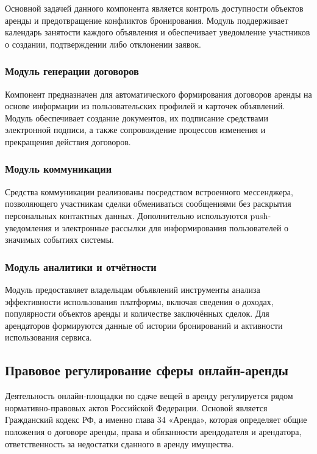Основной задачей данного компонента является контроль доступности объектов аренды и предотвращение конфликтов бронирования. Модуль поддерживает календарь занятости каждого объявления и обеспечивает уведомление участников о создании, подтверждении либо отклонении заявок.

\subsubsection{Модуль генерации договоров}

Компонент предназначен для автоматического формирования договоров аренды на основе информации из пользовательских профилей и карточек объявлений. Модуль обеспечивает создание документов, их подписание средствами электронной подписи, а также сопровождение процессов изменения и прекращения действия договоров.

\subsubsection{Модуль коммуникации}

Средства коммуникации реализованы посредством встроенного мессенджера, позволяющего участникам сделки обмениваться сообщениями без раскрытия персональных контактных данных. Дополнительно используются push-уведомления и электронные рассылки для информирования пользователей о значимых событиях системы.

\subsubsection{Модуль аналитики и отчётности}

Модуль предоставляет владельцам объявлений инструменты анализа эффективности использования платформы, включая сведения о доходах, популярности объектов аренды и количестве заключённых сделок. Для арендаторов формируются данные об истории бронирований и активности использования сервиса.

\subsection{Правовое регулирование сферы онлайн-аренды}

Деятельность онлайн-площадки по сдаче вещей в аренду регулируется рядом нормативно-правовых актов Российской Федерации. Основой является Гражданский кодекс РФ, а именно глава 34 «Аренда», которая определяет общие положения о договоре аренды, права и обязанности арендодателя и арендатора, ответственность за недостатки сданного в аренду имущества\cite{zakon2}.

